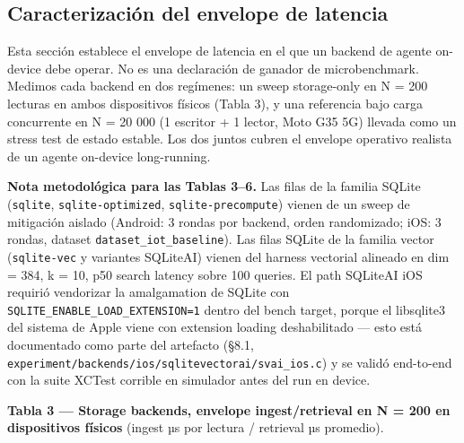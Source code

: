 \subsection{Caracterización del envelope de
latencia}\label{caracterizaciuxf3n-del-envelope-de-latencia}

Esta sección establece el envelope de latencia en el que un backend de agente
on-device debe operar. No es una declaración de ganador de microbenchmark.
Medimos cada backend en dos regímenes: un sweep storage-only en N = 200 lecturas
en ambos dispositivos físicos (Tabla 3), y una referencia bajo carga concurrente
en N = 20 000 (1 escritor + 1 lector, Moto G35 5G) llevada como un stress test
de estado estable. Los dos juntos cubren el envelope operativo realista de un
agente on-device long-running.

\textbf{Nota metodológica para las Tablas 3--6.} Las filas de la familia SQLite
(\texttt{sqlite}, \texttt{sqlite-optimized}, \texttt{sqlite-precompute}) vienen
de un sweep de mitigación aislado (Android: 3 rondas por backend, orden
randomizado; iOS: 3 rondas, dataset \texttt{dataset\_iot\_baseline}). Las filas
SQLite de la familia vector (\texttt{sqlite-vec} y variantes SQLiteAI) vienen
del harness vectorial alineado en dim = 384, k = 10, p50 search latency sobre
100 queries. El path SQLiteAI iOS requirió vendorizar la amalgamation de SQLite
con \texttt{SQLITE\_ENABLE\_LOAD\_EXTENSION=1} dentro del bench target, porque
el libsqlite3 del sistema de Apple viene con extension loading deshabilitado ---
esto está documentado como parte del artefacto (§8.1,
\texttt{experiment/backends/ios/sqlitevectorai/svai\_ios.c}) y se validó
end-to-end con la suite XCTest corrible en simulador antes del run en device.

\textbf{Tabla 3 --- Storage backends, envelope ingest/retrieval en N = 200 en
dispositivos físicos} (ingest µs por lectura / retrieval µs promedio).

